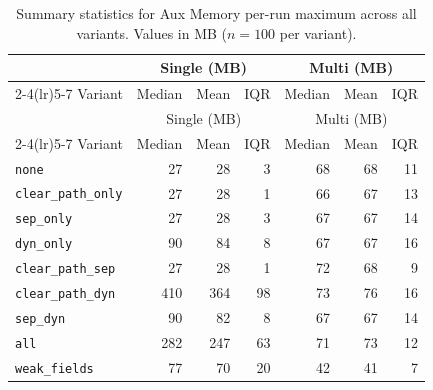 \begin{longtable}[c]{l rrr rrr}
\caption[Auxiliary GC memory summary statistics]{Summary statistics for Aux Memory per-run maximum across all variants. Values in MB ($n=100$ per variant).}\label{tab:stats-memory-aux} \\
\toprule
 & \multicolumn{3}{c}{Single (MB)} & \multicolumn{3}{c}{Multi (MB)} \\
\cmidrule(lr){2-4}\cmidrule(lr){5-7}
Variant & Median & Mean & IQR & Median & Mean & IQR \\
\midrule
\endfirsthead
\toprule
 & \multicolumn{3}{c}{Single (MB)} & \multicolumn{3}{c}{Multi (MB)} \\
\cmidrule(lr){2-4}\cmidrule(lr){5-7}
Variant & Median & Mean & IQR & Median & Mean & IQR \\
\midrule
\endhead
\bottomrule
\endfoot
\texttt{none} & 27 & 28 & 3 & 68 & 68 & 11 \\
\texttt{clear\_path\_only} & 27 & 28 & 1 & 66 & 67 & 13 \\
\texttt{sep\_only} & 27 & 28 & 3 & 67 & 67 & 14 \\
\texttt{dyn\_only} & 90 & 84 & 8 & 67 & 67 & 16 \\
\texttt{clear\_path\_sep} & 27 & 28 & 1 & 72 & 68 & 9 \\
\texttt{clear\_path\_dyn} & 410 & 364 & 98 & 73 & 76 & 16 \\
\texttt{sep\_dyn} & 90 & 82 & 8 & 67 & 67 & 14 \\
\texttt{all} & 282 & 247 & 63 & 71 & 73 & 12 \\
\texttt{weak\_fields} & 77 & 70 & 20 & 42 & 41 & 7 \\
\end{longtable}
